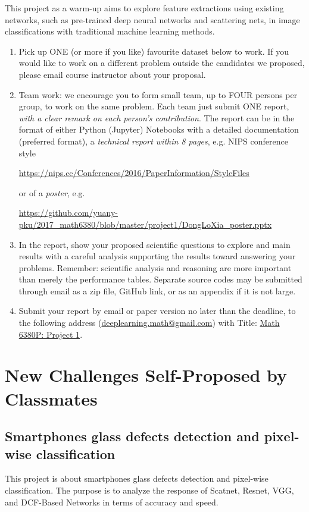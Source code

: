 \documentclass[11pt]{article}
\begin{document}
This project as a warm-up aims to explore feature extractions using existing networks, such as pre-trained deep neural networks and scattering nets, in image classifications with traditional machine learning methods.
\begin{enumerate}
\item Pick up ONE (or more if you like) favourite dataset below to work. If you would like to work on a different problem outside the candidates we proposed, please email course instructor about your proposal.  
\item Team work: we encourage you to form small team, up to FOUR persons per group, to work on the same problem. Each team just submit ONE report, \emph{with a clear remark on each person's contribution}. The report can be in the format of either Python (Jupyter) Notebooks with a detailed documentation (preferred format), a \emph{technical report within 8 pages}, e.g. NIPS conference style 
\begin{center}
\url{https://nips.cc/Conferences/2016/PaperInformation/StyleFiles} 
\end{center}
or of a \emph{poster}, e.g. 
\begin{center}%
\url{https://github.com/yuany-pku/2017_math6380/blob/master/project1/DongLoXia_poster.pptx}
\end{center}
\item In the report, show your proposed scientific questions to explore and main results with a careful analysis supporting the results toward answering your problems. Remember: scientific analysis and reasoning are more important than merely the performance tables. Separate source codes may be submitted through email as a zip file, GitHub link, or as an appendix if it is not large.    
\item Submit your report by email or paper version no later than the deadline, to the following address (\href{mailto:deeplearning.math@gmail.com}{deeplearning.math@gmail.com}) with Title: \underline{Math 6380P: Project 1}. %
\end{enumerate}


\section{New Challenges Self-Proposed by Classmates} 

\subsection{Smartphones glass defects detection and pixel-wise classification}
This project is about smartphones glass defects detection and pixel-wise classification. The purpose is to analyze the response of Scatnet, Resnet, VGG, and DCF-Based Networks in terms of accuracy and speed.
\end{document}
